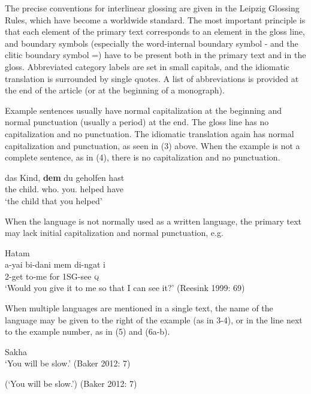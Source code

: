 \documentclass[a4paper]{article}
\newcommand{\eagsr}{\bgroup\color{blue}\ea}
\newcommand{\zgsr}{\z\egroup}
\begin{document}
The precise conventions for interlinear glossing are given in the
Leipzig Glossing Rules, which have become a worldwide standard. The most
important principle is that each element of the primary text corresponds
to an element in the gloss line, and boundary symbols (especially the
word-internal boundary symbol - and the clitic boundary symbol =) have
to be present both in the primary text and in the gloss. Abbreviated
category labels are set in small capitals, and the idiomatic translation
is surrounded by single quotes. A list of abbreviations is provided at
the end of the article (or at the beginning of a monograph).

Example sentences usually have normal capitalization at the beginning and normal
punctuation (usually a period) at the end. The gloss line has no
capitalization and no punctuation. The idiomatic translation again has
normal capitalization and punctuation, as seen in (3) above. When the
example is not a complete sentence, as in (4), there is no
capitalization and no punctuation.

\eagsr
\gll  das Kind, 	\textbf{dem} du 	     geholfen hast\\
      the child.\NOM{}  who.\DAT{}    you.\NOM{} helped   have\\
\glt  `the child that you helped' 
\zgsr

When the language is not normally used as a written language, the
primary text may lack initial capitalization and normal punctuation,
e.g.

\eagsr
\upshape Hatam\\
\gll a-yai    bi-dani mem di-ngat i \\
     2\SG-get to-me   for 1SG-see \textsc{q}\\ 
\glt `Would  you give it to me so that I can see it?' (Reesink 1999: 69)
\zgsr

When multiple languages are mentioned in a single text, the name of the
language may be given to the right of the example (as in 3-4), or in the
line next to the example number, as in (5) and (6a-b).

\eagsr
\upshape Sakha\\
  \eagsr[~]{
  \gll En  bytaan buol-uoq-uŋ\\
       you slow   be-\FUT-2\SG\\}
  \glt `You will be slow.' (Baker 2012: 7)

  \glt (`You will be slow.') (Baker 2012: 7)
  \zgsr
\zgsr
\end{document}
